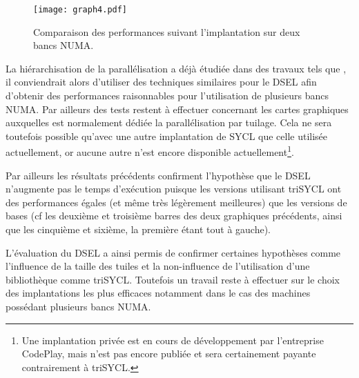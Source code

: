 \begin{figure}[!h]
  \caption{Comparaison des performances suivant l'implantation sur deux bancs NUMA.}
  \label{graph:comp_temps_mistral20core}
  \texttt{[image: graph4.pdf]}
\end{figure}

La hiérarchisation de la parallélisation a déjà étudiée dans des travaux tels que \cite{Ths3,Ths4}, il conviendrait alors d'utiliser des techniques similaires pour le DSEL afin d'obtenir des performances raisonnables pour l'utilisation de plusieurs bancs NUMA. Par ailleurs des tests restent à effectuer concernant les cartes graphiques auxquelles est normalement dédiée la parallélisation par tuilage. Cela ne sera toutefois possible qu'avec une autre implantation de \textsf{SYCL} que celle utilisée actuellement, or aucune autre n'est encore disponible actuellement\footnote{Une implantation privée est en cours de développement par l'entreprise \textsf{CodePlay}, mais n'est pas encore publiée et sera certainement payante contrairement à \textsf{triSYCL}.}.

Par ailleurs les résultats précédents confirment l'hypothèse que le DSEL n'augmente pas le temps d'exécution puisque les versions utilisant \textsf{triSYCL} ont des performances égales (et même très légèrement meilleures) que les versions de bases (cf les deuxième et troisième barres des deux graphiques précédents, ainsi que les cinquième et sixième, la première étant tout à gauche).

L'évaluation du DSEL a ainsi permis de confirmer certaines hypothèses comme l'influence de la taille des tuiles et la non-influence de l'utilisation d'une bibliothèque comme \textsf{triSYCL}. Toutefois un travail reste à effectuer sur le choix des implantations les plus efficaces notamment dans le cas des machines possédant plusieurs bancs NUMA.
